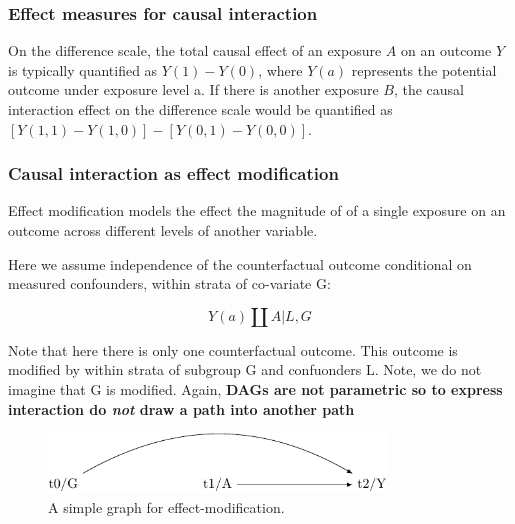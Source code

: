 \documentclass[
  singlecolumn]{report}
\begin{document}
\hypertarget{effect-measures-for-causal-interaction}{%
\subsubsection{\texorpdfstring{\textbf{Effect measures for causal
interaction}}{Effect measures for causal interaction}}\label{effect-measures-for-causal-interaction}}

On the difference scale, the total causal effect of an exposure \(A\) on
an outcome \(Y\) is typically quantified as \(Y(1) - Y(0)\), where
\(Y(a)\) represents the potential outcome under exposure level a. If
there is another exposure \(B\), the causal interaction effect on the
difference scale would be quantified as
\([Y(1,1) - Y(1,0)] - [Y(0,1) - Y(0,0)]\).

\hypertarget{causal-interaction-as-effect-modification}{%
\subsubsection{\texorpdfstring{\textbf{Causal interaction as effect
modification}}{Causal interaction as effect modification}}\label{causal-interaction-as-effect-modification}}

Effect modification models the effect the magnitude of of a single
exposure on an outcome across different levels of another variable.

Here we assume independence of the counterfactual outcome conditional on
measured confounders, within strata of co-variate G:

\[Y(a) \coprod A | L, G\]

Note that here there is only one counterfactual outcome. This outcome is
modified by within strata of subgroup G and confuonders L. Note, we do
not imagine that G is modified. Again, \textbf{DAGs are not parametric
so to express interaction do \emph{not} draw a path into another path}

\begin{figure}

{\centering \includegraphics[width=0.8\textwidth,height=\textheight]{causal-dags_files/figure-pdf/fig-dag-effect-modfication-1.pdf}

}

\caption{\label{fig-dag-effect-modfication}A simple graph for
effect-modification.}

\end{figure}
\end{document}
